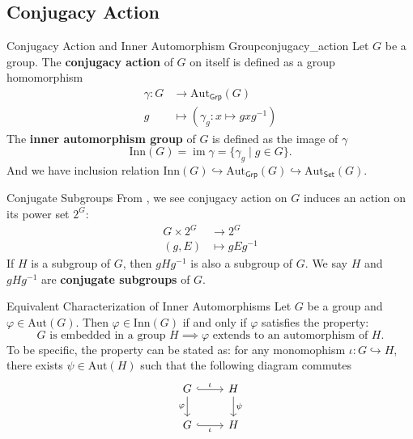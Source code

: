 \subsection{Conjugacy Action}
\begin{definition}{Conjugacy Action and Inner Automorphism Group}{conjugacy_action}
    Let $G$ be a group. The \textbf{conjugacy action} of $G$ on itself is defined as a group homomorphism
    \begin{align*}
        \gamma:G & \longrightarrow \mathrm{Aut}_{\mathsf{Grp}}(G) \\
        g        & \longmapsto (\gamma_g: x\longmapsto gxg^{-1})
    \end{align*}
    The \textbf{inner automorphism group} of $G$ is defined as the image of $\gamma$
    $$
        \mathrm{Inn}(G)=\operatorname{im}\gamma=\{ \gamma_g\mid g\in G\}.
    $$
    And we have inclusion relation $\mathrm{Inn}(G)\hookrightarrow\mathrm{Aut}_{\mathsf{Grp}}(G)\hookrightarrow\mathrm{Aut}_{\mathsf{Set}}(G)$.
\end{definition}

\begin{definition}{Conjugate Subgroups}{}
    From , we see conjugacy action on $G$ induces an action on its power set $2^G$: \begin{align*}
        G\times 2^G & \longrightarrow 2^G  \\
        (g,E)       & \longmapsto gEg^{-1}
    \end{align*}
    If $H$ is a subgroup of $G$, then $gHg^{-1}$ is also a subgroup of $G$. We say $H$ and $gHg^{-1}$ are \textbf{conjugate subgroups} of $G$.
\end{definition}

\begin{proposition}{Equivalent
        Characterization of Inner Automorphisms}{}
    Let $G$ be a group and $\varphi \in \mathrm{Aut}(G)$. Then $\varphi \in \mathrm{Inn}(G)$ if and only if $\varphi$ satisfies the property:
    \[
        \text{$G$ is embedded in a group $H$} \implies \text{$\varphi$ extends to an automorphism of $H$}.
    \]
    To be specific, the property can be stated as: for any monomophism $\iota:G\hookrightarrow H$,
    there exists $\psi\in \mathrm{Aut}(H)$ such that the following diagram commutes
    \[
        \begin{tikzcd}[ampersand replacement=\&]
            G \arrow[r, hook, "\iota"] \arrow[d, "\varphi"'] \& H \arrow[d, "\psi"] \\
            G \arrow[r, hook, "\iota"']                      \& H
        \end{tikzcd}
    \]
\end{proposition}




